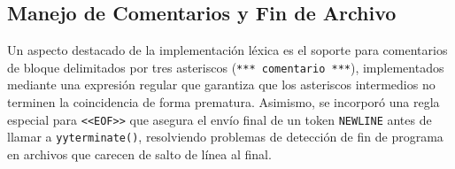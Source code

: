 \documentclass[conference]{IEEEtran}
\begin{document}
\begin{table}[htbp]
\caption{Componentes Léxicos y Tokens Reconocidos}
\label{tab:tokens}
\centering
{}
\end{table}

\subsection{Manejo de Comentarios y Fin de Archivo}
Un aspecto destacado de la implementación léxica es el soporte para comentarios de bloque delimitados por tres asteriscos (\texttt{*** comentario ***}), implementados mediante una expresión regular que garantiza que los asteriscos intermedios no terminen la coincidencia de forma prematura. Asimismo, se incorporó una regla especial para \texttt{<<EOF>>} que asegura el envío final de un token \texttt{NEWLINE} antes de llamar a \texttt{yyterminate()}, resolviendo problemas de detección de fin de programa en archivos que carecen de salto de línea al final.
\end{document}
